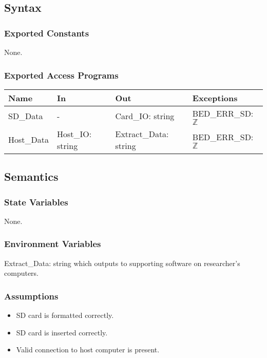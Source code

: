 \documentclass[12pt, titlepage]{article}
\begin{document}
\subsection{Syntax}

\subsubsection{Exported Constants}

None.

\subsubsection{Exported Access Programs}

\begin{center}
\begin{tabular}{p{2cm} p{4cm} p{4cm} p{2cm}}
\hline
\textbf{Name} & \textbf{In} & \textbf{Out} & \textbf{Exceptions} \\
\hline
SD\_Data & - & Card\_IO: string & BED\_ERR\_SD: $\mathbb{Z}$ \\
Host\_Data & Host\_IO: string & Extract\_Data: string & BED\_ERR\_SD: $\mathbb{Z}$ \\
\hline
\end{tabular}
\end{center}

\subsection{Semantics}

\subsubsection{State Variables}

None.

\subsubsection{Environment Variables}

Extract\_Data: string which outputs to supporting software on researcher's computers.

\subsubsection{Assumptions}

\begin{itemize}
\item SD card is formatted correctly.
\item SD card is inserted correctly.
\item Valid connection to host computer is present.
\end{itemize}
\end{document}
